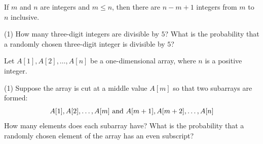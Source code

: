 \documentclass[../mathNotesPreamble]{subfiles}
\begin{document}
  \begin{thmBox*}
    If $m$ and $n$ are integers and $m\leq n$, then there are $n-m+1$ integers from $m$ to $n$ inclusive.
  \end{thmBox*}
  \begin{ex*}
    \mbox{}
    \begin{extasks}[after-item-skip=\stretch{1}](1)
      \task How many three-digit integers are divisible by $5$?
      \task What is the probability that a randomly chosen three-digit integer is divisible by $5$?
    \end{extasks}
  \end{ex*}
  \pagebreak
 
  \begin{ex*}
    Let $A[1], A[2],\dots, A[n]$ be a one-dimensional array, where $n$ is a positive integer.
    \begin{extasks}[after-item-skip=\stretch{1}](1)
      \task Suppose the array is cut at a middle value $A[m]$ so that two subarrays are formed:
        \[A[1], A[2],\dots, A[m] \textnormal{ and } A[m+1], A[m+2],\dots, A[n]\]
        How many elements does each subarray have?
      \task 
        What is the probability that a randomly chosen element of the array has an even subscript?
    \end{extasks}
  \end{ex*}

  \pagebreak
\end{document}
